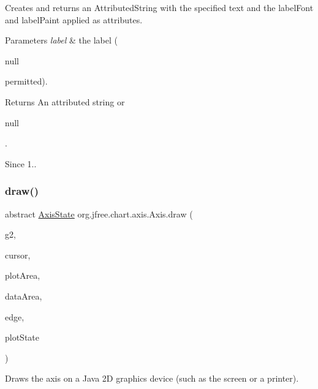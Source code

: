 Creates and returns an {\ttfamily Attributed\+String} with the specified text and the label\+Font and label\+Paint applied as attributes.


\begin{DoxyParams}{Parameters}
{\em label} & the label (
\begin{DoxyCode}
null 
\end{DoxyCode}
 permitted).\\
\hline
\end{DoxyParams}
\begin{DoxyReturn}{Returns}
An attributed string or
\begin{DoxyCode}
null 
\end{DoxyCode}
 .
\end{DoxyReturn}
\begin{DoxySince}{Since}
1.. 
\end{DoxySince}
\mbox{\label{classorg_1_1jfree_1_1chart_1_1axis_1_1_axis_a39a6bcf4a2e244f134d6247b7a96734a}} 
\subsubsection{\texorpdfstring{draw()}{draw()}}
{\footnotesize\ttfamily abstract \mbox{\hyperlink{classorg_1_1jfree_1_1chart_1_1axis_1_1_axis_state}{Axis\+State}} org.\+jfree.\+chart.\+axis.\+Axis.\+draw (\begin{DoxyParamCaption}\item[{Graphics2D}]{g2,  }\item[{double}]{cursor,  }\item[{Rectangle2D}]{plot\+Area,  }\item[{Rectangle2D}]{data\+Area,  }\item[{Rectangle\+Edge}]{edge,  }\item[{\mbox{\hyperlink{classorg_1_1jfree_1_1chart_1_1plot_1_1_plot_rendering_info}{Plot\+Rendering\+Info}}}]{plot\+State }\end{DoxyParamCaption})\hspace{0.3cm}{\ttfamily [abstract]}}

Draws the axis on a Java 2D graphics device (such as the screen or a printer).


